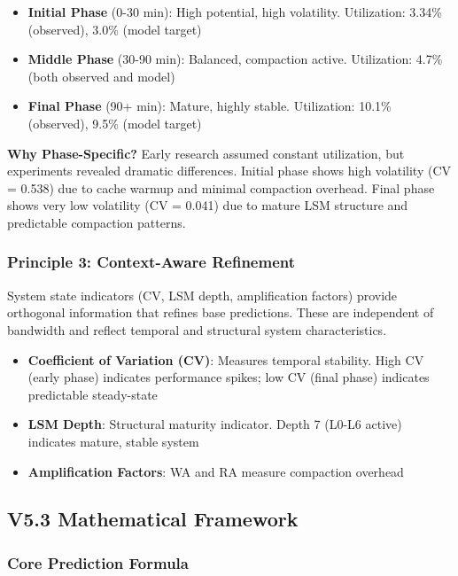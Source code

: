 \begin{itemize}
    \item \textbf{Initial Phase} (0-30 min): High potential, high volatility. Utilization: 3.34\% (observed), 3.0\% (model target)
    \item \textbf{Middle Phase} (30-90 min): Balanced, compaction active. Utilization: 4.7\% (both observed and model)
    \item \textbf{Final Phase} (90+ min): Mature, highly stable. Utilization: 10.1\% (observed), 9.5\% (model target)
\end{itemize}

\textbf{Why Phase-Specific?} Early research assumed constant utilization, but experiments revealed dramatic differences. Initial phase shows high volatility (CV = 0.538) due to cache warmup and minimal compaction overhead. Final phase shows very low volatility (CV = 0.041) due to mature LSM structure and predictable compaction patterns.

\subsubsection{Principle 3: Context-Aware Refinement}

System state indicators (CV, LSM depth, amplification factors) provide orthogonal information that refines base predictions. These are independent of bandwidth and reflect temporal and structural system characteristics.

\begin{itemize}
    \item \textbf{Coefficient of Variation (CV)}: Measures temporal stability. High CV (early phase) indicates performance spikes; low CV (final phase) indicates predictable steady-state
    \item \textbf{LSM Depth}: Structural maturity indicator. Depth 7 (L0-L6 active) indicates mature, stable system
    \item \textbf{Amplification Factors}: WA and RA measure compaction overhead
\end{itemize}

\subsection{V5.3 Mathematical Framework}

\subsubsection{Core Prediction Formula}

